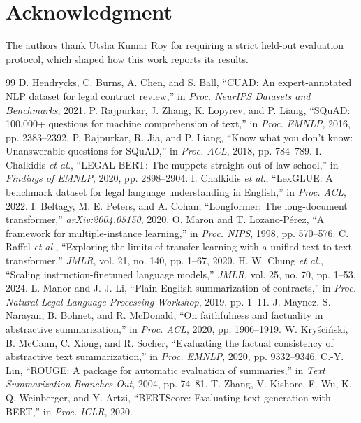 \documentclass[journal]{IEEEtran}
\begin{document}
\section*{Acknowledgment}
The authors thank Utsha Kumar Roy for requiring a strict held-out evaluation protocol, which shaped
how this work reports its results.

\begin{thebibliography}{99}
 D. Hendrycks, C. Burns, A. Chen, and S. Ball, ``CUAD: An expert-annotated NLP dataset for legal contract review,'' in \emph{Proc. NeurIPS Datasets and Benchmarks}, 2021.
 P. Rajpurkar, J. Zhang, K. Lopyrev, and P. Liang, ``SQuAD: 100,000+ questions for machine comprehension of text,'' in \emph{Proc. EMNLP}, 2016, pp. 2383--2392.
 P. Rajpurkar, R. Jia, and P. Liang, ``Know what you don't know: Unanswerable questions for SQuAD,'' in \emph{Proc. ACL}, 2018, pp. 784--789.
 I. Chalkidis \emph{et al.}, ``LEGAL-BERT: The muppets straight out of law school,'' in \emph{Findings of EMNLP}, 2020, pp. 2898--2904.
 I. Chalkidis \emph{et al.}, ``LexGLUE: A benchmark dataset for legal language understanding in English,'' in \emph{Proc. ACL}, 2022.
 I. Beltagy, M. E. Peters, and A. Cohan, ``Longformer: The long-document transformer,'' \emph{arXiv:2004.05150}, 2020.
 O. Maron and T. Lozano-P\'erez, ``A framework for multiple-instance learning,'' in \emph{Proc. NIPS}, 1998, pp. 570--576.
 C. Raffel \emph{et al.}, ``Exploring the limits of transfer learning with a unified text-to-text transformer,'' \emph{JMLR}, vol. 21, no. 140, pp. 1--67, 2020.
 H. W. Chung \emph{et al.}, ``Scaling instruction-finetuned language models,'' \emph{JMLR}, vol. 25, no. 70, pp. 1--53, 2024.
 L. Manor and J. J. Li, ``Plain English summarization of contracts,'' in \emph{Proc. Natural Legal Language Processing Workshop}, 2019, pp. 1--11.
 J. Maynez, S. Narayan, B. Bohnet, and R. McDonald, ``On faithfulness and factuality in abstractive summarization,'' in \emph{Proc. ACL}, 2020, pp. 1906--1919.
 W. Kry\'sci\'nski, B. McCann, C. Xiong, and R. Socher, ``Evaluating the factual consistency of abstractive text summarization,'' in \emph{Proc. EMNLP}, 2020, pp. 9332--9346.
 C.-Y. Lin, ``ROUGE: A package for automatic evaluation of summaries,'' in \emph{Text Summarization Branches Out}, 2004, pp. 74--81.
 T. Zhang, V. Kishore, F. Wu, K. Q. Weinberger, and Y. Artzi, ``BERTScore: Evaluating text generation with BERT,'' in \emph{Proc. ICLR}, 2020.

\end{thebibliography}
\end{document}
